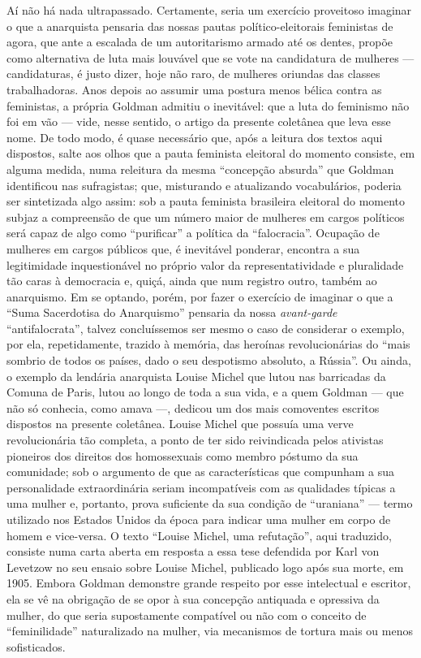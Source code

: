 Aí não há nada ultrapassado. Certamente, seria um exercício proveitoso
imaginar o que a anarquista pensaria das nossas pautas
político-eleitorais feministas de agora, que ante a escalada de um
autoritarismo armado até os dentes, propõe como alternativa de luta mais
louvável que se vote na candidatura de mulheres --- candidaturas, é justo
dizer, hoje não raro, de mulheres oriundas das classes trabalhadoras.
Anos depois ao assumir uma postura menos bélica contra as feministas, a
própria Goldman admitiu o inevitável: que a luta do feminismo não foi em
vão --- vide, nesse sentido, o artigo da presente coletânea que leva esse
nome. De todo modo, é quase necessário que, após a leitura dos textos
aqui dispostos, salte aos olhos que a pauta feminista eleitoral do
momento consiste, em alguma medida, numa releitura da mesma ``concepção
absurda'' que Goldman identificou nas sufragistas; que, misturando e
atualizando vocabulários, poderia ser sintetizada algo assim: sob a
pauta feminista brasileira eleitoral do momento subjaz a compreensão de
que um número maior de mulheres em cargos políticos será capaz de algo
como ``purificar'' a política da ``falocracia''. Ocupação de mulheres em
cargos públicos que, é inevitável ponderar, encontra a sua legitimidade
inquestionável no próprio valor da representatividade e pluralidade tão
caras à democracia e, quiçá, ainda que num registro outro, também ao
anarquismo. Em se optando, porém, por fazer o exercício de imaginar o
que a ``Suma Sacerdotisa do Anarquismo'' pensaria da nossa
\emph{avant-garde} ``antifalocrata'', talvez concluíssemos ser mesmo o
caso de considerar o exemplo, por ela, repetidamente, trazido à memória,
das heroínas revolucionárias do ``mais sombrio de todos os países, dado
o seu despotismo absoluto, a Rússia''. Ou ainda, o exemplo da lendária
anarquista Louise Michel que lutou nas barricadas da Comuna de Paris,
lutou ao longo de toda a sua vida, e a quem Goldman --- que não só
conhecia, como amava ---, dedicou um dos mais comoventes escritos
dispostos na presente coletânea. Louise Michel que possuía uma verve
revolucionária tão completa, a ponto de ter sido reivindicada pelos
ativistas pioneiros dos direitos dos homossexuais como membro póstumo da
sua comunidade; sob o argumento de que as características que compunham
a sua personalidade extraordinária seriam incompatíveis com as
qualidades típicas a uma mulher e, portanto, prova suficiente da sua
condição de ``uraniana'' --- termo utilizado nos Estados Unidos da época
para indicar uma mulher em corpo de homem e vice-versa. O texto ``Louise
Michel, uma refutação'', aqui traduzido, consiste numa carta aberta em
resposta a essa tese defendida por Karl von Levetzow no seu ensaio sobre
Louise Michel, publicado logo após sua morte, em 1905. Embora Goldman
demonstre grande respeito por esse intelectual e escritor, ela se vê na
obrigação de se opor à sua concepção antiquada e opressiva da mulher, do
que seria supostamente compatível ou não com o conceito de
``feminilidade'' naturalizado na mulher, via mecanismos de tortura mais
ou menos sofisticados.

